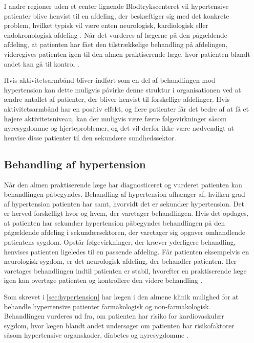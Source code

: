 I andre regioner uden et center lignende Blodtrykscenteret vil hypertensive patienter blive henvist til en afdeling, der beskæftiger sig med det konkrete problem, hvilket typisk vil være enten neurologisk, kardiologisk eller endokronologisk afdeling \citep{buur2011}. Når det vurderes af lægerne på den pågældende afdeling, at patienten har fået den tilstrækkelige behandling på afdelingen, videregives patienten igen til den almen praktiserende læge, hvor patienten blandt andet kan gå til kontrol \citep{sundhedsstyrelsen2010, lodberg2016}.

Hvis aktivitetsarmbånd bliver indført som en del af behandlingen mod hypertension kan dette muligvis påvirke denne struktur i organisationen ved at ændre antallet af patienter, der bliver henvist til forskellige afdelinger. Hvis aktivitetsarmbånd har en positiv effekt, og flere patienter får det bedre af at få et højere aktivitetsniveau, kan der muligvis være færre følgevirkninger såsom nyresygdomme og hjerteproblemer, og det vil derfor ikke være nødvendigt at henvise disse patienter til den sekundære sundhedssektor. 

\subsection{Behandling af hypertension}

Når den almen praktiserende læge har diagnosticeret og vurderet patienten kan behandlingen påbegyndes. Behandling af hypertension afhænger af, hvilken grad af hypertension patienten har samt, hvorvidt det er sekundær hypertension. Det er herved forskelligt hvor og hvem, der varetager behandlingen. Hvis det opdages, at patienten har sekundær hypertension påbegyndes behandlingen på den pågældende afdeling i sekundærsektoren, der varetager sig opgaver omhandlende patientens sygdom. Opstår følgevirkninger, der kræver yderligere behandling, henvises patienten ligeledes til en passende afdeling. Får patienten eksempelvis en neurologisk sygdom, er det neurologisk afdeling, der behandler patienten. Her varetages behandlingen indtil patienten er stabil, hvorefter en praktiserende læge igen kan overtage patienten og kontrollere den videre behandling \citep{sundhedsstyrelsen2010}.

Som skrevet i \autoref{sec:hypertension} har lægen i den almene klinik mulighed for at behandle hypertensive patienter farmakologisk og non-farmakologisk. Behandlingen vurderes ud fra, om patienten har risiko for kardiovaskulær sygdom, hvor lægen blandt andet undersøger om patienten har risikofaktorer såsom hypertensive organskader, diabetes og nyresygdomme \citep{promedicin2016}.

